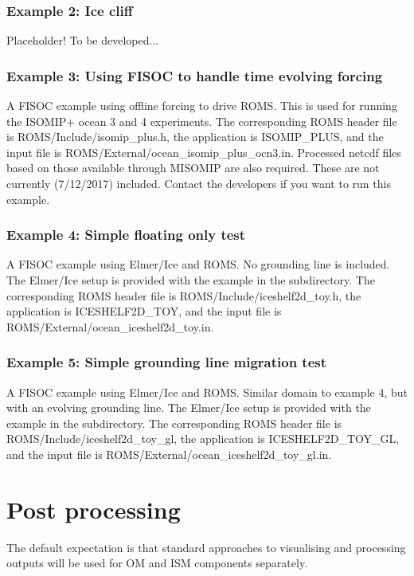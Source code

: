 \documentclass[12pt]{article}
\begin{document}
\subsubsection{Example 2: Ice cliff}
Placeholder!  To be developed...

\subsubsection{Example 3: Using FISOC to handle time evolving forcing}
A FISOC example using offline forcing to drive ROMS. 
This is used for running the ISOMIP+ ocean 3 and 4 experiments.
The corresponding ROMS header file is ROMS/Include/isomip\_plus.h, 
the application is ISOMIP\_PLUS, 
and the input file is ROMS/External/ocean\_isomip\_plus\_ocn3.in.
Processed netcdf files based on those available through MISOMIP 
are also required.  These are not currently (7/12/2017) 
included.  Contact the developers if you want to run this example. 

\subsubsection{Example 4: Simple floating only test}
A FISOC example using Elmer/Ice and ROMS. No grounding line is included. 
The Elmer/Ice setup is provided with the example in the subdirectory. 
The corresponding ROMS header file is ROMS/Include/iceshelf2d\_toy.h, 
the application is ICESHELF2D\_TOY, 
and the input file is ROMS/External/ocean\_iceshelf2d\_toy.in.

\subsubsection{Example 5: Simple grounding line migration test}
A FISOC example using Elmer/Ice and ROMS. Similar domain to 
example 4, but with an evolving grounding line.
The Elmer/Ice setup is provided with the example in the subdirectory. 
The corresponding ROMS header file is ROMS/Include/iceshelf2d\_toy\_gl, 
the application is ICESHELF2D\_TOY\_GL, 
and the input file is ROMS/External/ocean\_iceshelf2d\_toy\_gl.in.




\section{Post processing}
The default expectation is that standard approaches to visualising and 
processing outputs will be used for OM and ISM components separately. 
\end{document}
